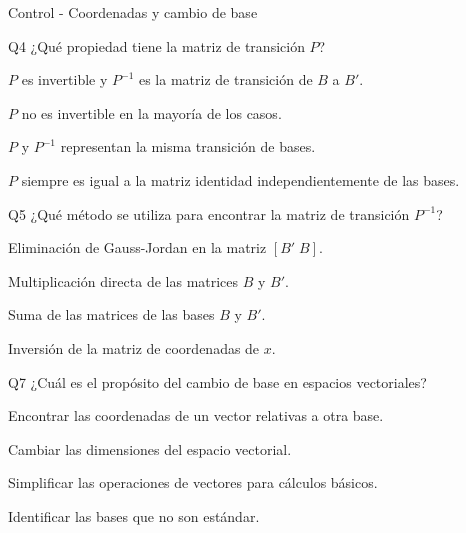 \documentclass[a4,11pt]{aleph-notas}
\begin{document}
\begin{quiz}{Control - Coordenadas y cambio de base}
\begin{multi}[]{Q4}
    ¿Qué propiedad tiene la matriz de transición $P$?
    \item* $P$ es invertible y $P^{-1}$ es la matriz de transición de $B$ a $B'$.
    \item $P$ no es invertible en la mayoría de los casos.
    \item $P$ y $P^{-1}$ representan la misma transición de bases.
    \item $P$ siempre es igual a la matriz identidad independientemente de las bases.
\end{multi}

\begin{multi}[]{Q5}
    ¿Qué método se utiliza para encontrar la matriz de transición $P^{-1}$?
    \item* Eliminación de Gauss-Jordan en la matriz $[B' \; B]$.
    \item Multiplicación directa de las matrices $B$ y $B'$.
    \item Suma de las matrices de las bases $B$ y $B'$.
    \item Inversión de la matriz de coordenadas de $x$.
\end{multi}

\begin{multi}[]{Q7}
    ¿Cuál es el propósito del cambio de base en espacios vectoriales?
    \item* Encontrar las coordenadas de un vector relativas a otra base.
    \item Cambiar las dimensiones del espacio vectorial.
    \item Simplificar las operaciones de vectores para cálculos básicos.
    \item Identificar las bases que no son estándar.
\end{multi}


\end{quiz}
\end{document}

